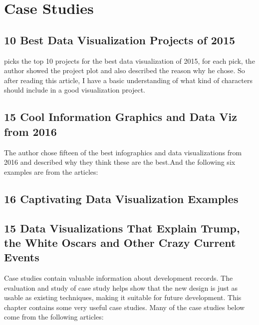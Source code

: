 \documentclass[]{book}
\theoremstyle{definition}
\theoremstyle{definition}
\theoremstyle{definition}
\theoremstyle{remark}
\begin{document}
\chapter{Case Studies}\label{case-studies}

\section{10 Best Data Visualization Projects of
2015}\label{best-data-visualization-projects-of-2015}

\citep{10_BEST} picks the top 10 projects for the best data
visualization of 2015, for each pick, the author showed the project plot
and also described the reason why he chose. So after reading this
article, I have a basic understanding of what kind of characters should
include in a good visualization project.

\section{15 Cool Information Graphics and Data Viz from
2016}\label{cool-information-graphics-and-data-viz-from-2016}

\citep{cool_data} The author chose fifteen of the best infographics and
data visualizations from 2016 and described why they think these are the
best.And the following six examples are from the articles:

\section{16 Captivating Data Visualization
Examples}\label{captivating-data-visualization-examples}

\citep{int_viz_capt}

\section{15 Data Visualizations That Explain Trump, the White Oscars and
Other Crazy Current
Events}\label{data-visualizations-that-explain-trump-the-white-oscars-and-other-crazy-current-events}

\citep{int_viz_2}

Case studies contain valuable information about development records. The
evaluation and study of case study helps show that the new design is
just as usable as existing techniques, making it suitable for future
development. This chapter contains some very useful case studies. Many
of the case studies below come from the following articles:
\end{document}

